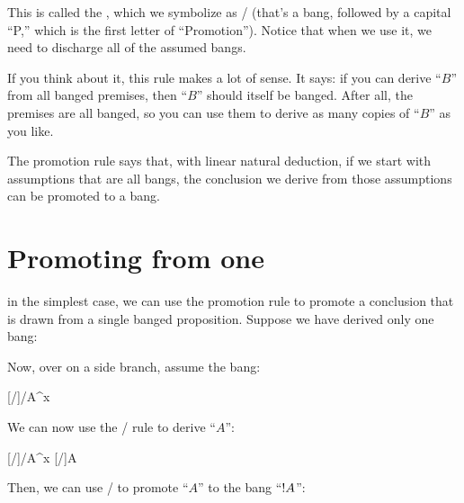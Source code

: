 \documentclass[../../../main.tex]{subfiles}
\begin{document}
\noindent
This is called the , which we symbolize as \bangProm/ (that's a bang, followed by a capital ``P,'' which is the first letter of ``Promotion''). Notice that when we use it, we need to discharge all of the assumed bangs.

If you think about it, this rule makes a lot of sense. It says: if you can derive ``$B$'' from all banged premises, then ``$B$'' should itself be banged. After all, the premises are all banged, so you can use them to derive as many copies of ``$B$'' as you like.

The promotion rule says that, with linear natural deduction, if we start with assumptions that are all bangs, the conclusion we derive from those assumptions can be promoted to a bang.


\section{Promoting from one}

in the simplest case, we can use the promotion rule to promote a conclusion that is drawn from a single banged proposition. Suppose we have derived only one bang:

\begin{prooftree*}
  \hypo{}
\end{prooftree*}

\noindent
Now, over on a side branch, assume the bang:

\begin{prooftree*}
  \hypo{}
  
  \hypo{}
  [\startrule/]{\bang/A^{x}}
  
\end{prooftree*}

\noindent
We can now use the \bangCopy/ rule to derive ``$A$'':

\begin{prooftree*}
  \hypo{}
  
  \hypo{}
  [\startrule/]{\bang/A^{x}}
  [\bangCopy/]{A}
  
\end{prooftree*}

\noindent
Then, we can use \bangProm/ to promote ``$A$'' to the bang ``$\bang/A$'':
\end{document}
